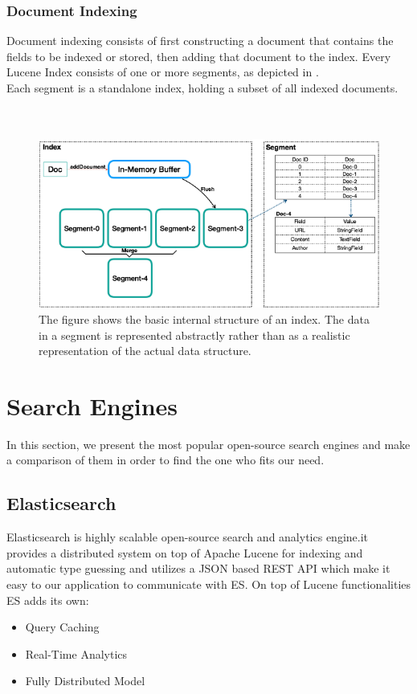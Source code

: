 \subsubsection{Document Indexing}
Document indexing consists of first constructing a document that contains the fields to be indexed or stored, then adding that document to the index.
Every Lucene Index consists of one or more segments, as depicted in .\\
Each segment is a standalone index, holding a subset of all indexed documents.
\\
\\
\\
\begin{figure}[!htb]
\begin{center}
\includegraphics[scale=1.0]{images/segments.png}
\end{center}
\caption[Analysis of Lucene - Basic Concepts]{The figure shows the basic internal structure of an index. The data in a segment is represented abstractly rather than as a realistic representation of the actual data structure.}
\label{lucene_segments}
\end{figure}

\section{Search Engines}
In this section, we present the most popular open-source search engines and make a comparison of them in order to find the one who fits our need. 

\subsection{Elasticsearch}
Elasticsearch is highly scalable open-source search and analytics engine.it provides a distributed
system on top of Apache Lucene for indexing and automatic type guessing and utilizes a JSON based REST API which make it easy to our application to communicate with ES.
On top of Lucene functionalities ES adds its own:
\begin{itemize}
    \item Query Caching
    \item Real-Time Analytics
    \item Fully Distributed Model
\end{itemize}

